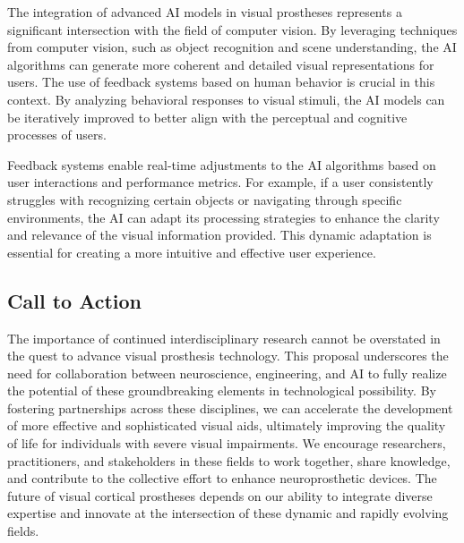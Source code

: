 \documentclass[10pt]{article}
\begin{document}
The integration of advanced AI models in visual prostheses represents a
significant intersection with the field of computer vision. By leveraging
techniques from computer vision, such as object recognition and scene
understanding, the AI algorithms can generate more coherent and detailed visual
representations for users. The use of feedback systems based on human behavior
is crucial in this context. By analyzing behavioral responses to visual stimuli,
the AI models can be iteratively improved to better align with the perceptual
and cognitive processes of users.

Feedback systems enable real-time adjustments to the AI algorithms based on user
interactions and performance metrics. For example, if a user consistently
struggles with recognizing certain objects or navigating through specific
environments, the AI can adapt its processing strategies to enhance the clarity
and relevance of the visual information provided. This dynamic adaptation is
essential for creating a more intuitive and effective user experience.

\subsection*{Call to Action}
The importance of continued interdisciplinary research cannot be overstated in
the quest to advance visual prosthesis technology. This proposal underscores the
need for collaboration between neuroscience, engineering, and AI to fully
realize the potential of these groundbreaking elements in technological
possibility. By fostering partnerships across these disciplines, we can
accelerate the development of more effective and sophisticated visual aids,
ultimately improving the quality of life for individuals with severe visual
impairments. We encourage researchers, practitioners, and stakeholders in these
fields to work together, share knowledge, and contribute to the collective
effort to enhance neuroprosthetic devices. The future of visual cortical
prostheses depends on our ability to integrate diverse expertise and innovate at
the intersection of these dynamic and rapidly evolving fields.
\clearpage
\end{document}

